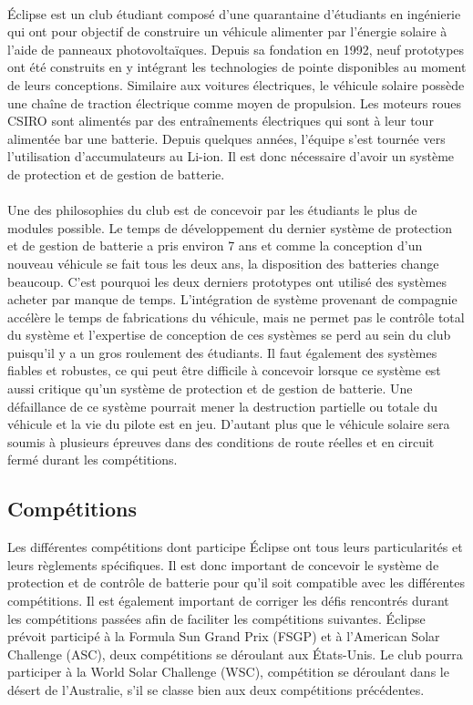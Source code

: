 		\paragraph{}
		Éclipse est un club étudiant composé d'une quarantaine d'étudiants en ingénierie qui ont pour objectif de construire un véhicule alimenter par l'énergie solaire à l'aide de panneaux photovoltaïques. Depuis sa fondation en 1992, neuf prototypes ont été construits en y intégrant les technologies de pointe disponibles au moment de leurs conceptions. Similaire aux voitures électriques, le véhicule solaire possède une chaîne de traction électrique comme moyen de propulsion. Les moteurs roues  CSIRO sont alimentés par des entraînements électriques qui sont à leur tour alimentée bar une batterie. Depuis quelques années, l'équipe s'est tournée vers l'utilisation d'accumulateurs au Li-ion. Il est donc nécessaire d'avoir un système de protection et de gestion de batterie.
		
		\paragraph{}
		Une des philosophies du club est de concevoir par les étudiants le plus de modules possible. Le temps de développement du dernier système de protection et de gestion de batterie a pris environ 7 ans et comme la conception d'un nouveau véhicule se fait tous les deux ans, la disposition des batteries change beaucoup. C'est pourquoi les deux derniers prototypes ont utilisé des systèmes acheter par manque de temps. L'intégration de système provenant de compagnie accélère le temps de fabrications du véhicule, mais ne permet pas le contrôle total du système et l'expertise de conception de ces systèmes se perd au sein du club puisqu'il y a un gros roulement des étudiants. Il faut également des systèmes fiables et robustes, ce qui peut être difficile à concevoir lorsque ce système est aussi critique qu'un système de protection et de gestion de batterie. Une défaillance de ce système pourrait mener la destruction partielle ou totale du véhicule et la vie du pilote est en jeu. D'autant plus que le véhicule solaire sera soumis à plusieurs épreuves dans des conditions de route réelles et en circuit fermé durant les compétitions.
		
		
		\subsection{Compétitions}
		Les différentes compétitions dont participe Éclipse ont tous leurs particularités et leurs règlements spécifiques. Il est donc important de concevoir le système de protection et de contrôle de batterie pour qu'il soit compatible avec les différentes compétitions. Il est également important de corriger les défis rencontrés durant les compétitions passées afin de faciliter les compétitions suivantes. Éclipse prévoit participé à la Formula Sun Grand Prix (FSGP) et à l'American Solar Challenge (ASC), deux compétitions se déroulant aux États-Unis. Le club pourra participer à la World Solar Challenge (WSC), compétition se déroulant dans le désert de l'Australie, s'il se classe bien aux deux compétitions précédentes.
		
